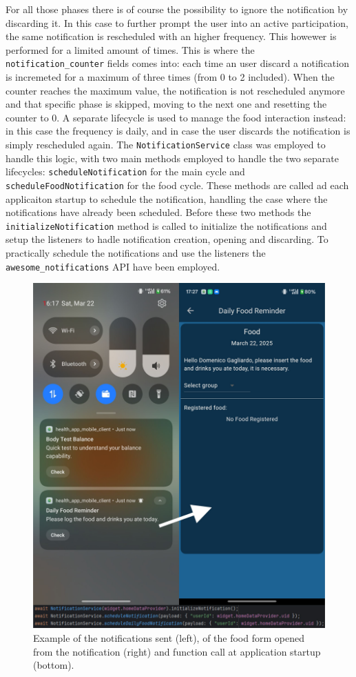 \noindent For all those phases there is of course the possibility to ignore the notification by discarding it. In this case to further prompt the user into an active participation, the same notification is rescheduled with an higher frequency. This howewer is performed for a limited amount of times. This is where the \texttt{notification\_counter} fields comes into: each time an user discard a notification is incremeted for a maximum of three times (from 0 to 2 included). When the counter reaches the maximum value, the notification is not rescheduled anymore and that specific phase is skipped, moving to the next one and resetting the counter to 0.
\newpage \noindent A separate lifecycle is used to manage the food interaction instead: in this case the frequency is daily, and in case the user discards the notification is simply rescheduled again. 
\newline The \texttt{NotificationService} class was employed to handle this logic, with two main methods employed to handle the two separate lifecycles: \texttt{scheduleNotification} for the main cycle and \texttt{scheduleFoodNotification} for the food cycle. These methods are called ad each applicaiton startup to schedule the notification, handling the case where the notifications have already been scheduled. Before these two methods the \texttt{initializeNotification} method is called to initialize the notifications and setup the listeners to hadle notification creation, opening and discarding. To practically schedule the notifications and use the listeners the \texttt{awesome\_notifications} API have been employed. 

\begin{figure}
    \centering
    \includegraphics[width=0.7\linewidth]{./images/notifications.jpg}
    \caption{Example of the notifications sent (left), of the food form opened from the notification (right) and function call at application startup (bottom).}
\end{figure}

